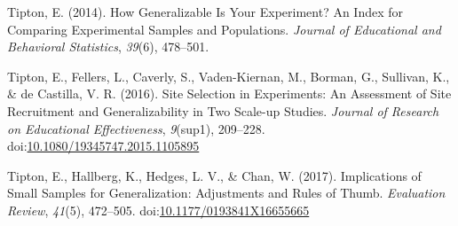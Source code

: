 \documentclass[man,floatsintext]{apa6}
\begin{document}
\leavevmode\hypertarget{ref-tiptonHowGeneralizableYour2014}{}%
Tipton, E. (2014). How Generalizable Is Your Experiment? An Index for Comparing Experimental Samples and Populations. \emph{Journal of Educational and Behavioral Statistics}, \emph{39}(6), 478--501.

\leavevmode\hypertarget{ref-tiptonSiteSelectionExperiments2016}{}%
Tipton, E., Fellers, L., Caverly, S., Vaden-Kiernan, M., Borman, G., Sullivan, K., \& de Castilla, V. R. (2016). Site Selection in Experiments: An Assessment of Site Recruitment and Generalizability in Two Scale-up Studies. \emph{Journal of Research on Educational Effectiveness}, \emph{9}(sup1), 209--228. doi:\href{https://doi.org/10.1080/19345747.2015.1105895}{10.1080/19345747.2015.1105895}

\leavevmode\hypertarget{ref-tiptonImplicationsSmallSamples2017}{}%
Tipton, E., Hallberg, K., Hedges, L. V., \& Chan, W. (2017). Implications of Small Samples for Generalization: Adjustments and Rules of Thumb. \emph{Evaluation Review}, \emph{41}(5), 472--505. doi:\href{https://doi.org/10.1177/0193841X16655665}{10.1177/0193841X16655665}

\endgroup
\end{document}
